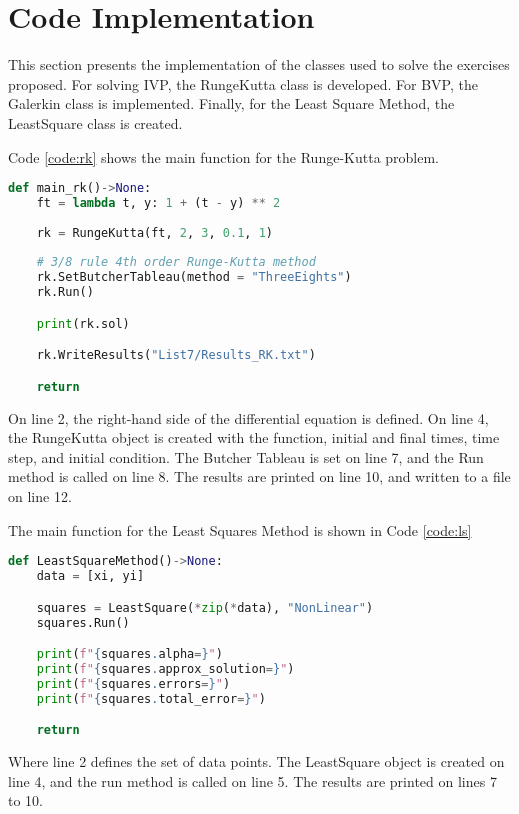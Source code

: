 \section{Code Implementation}\label{sec:code_implementation}
This section presents the implementation of the classes used to solve the exercises proposed. For solving IVP, the RungeKutta class is developed. For BVP, the Galerkin class is implemented. Finally, for the Least Square Method, the LeastSquare class is created.

Code \ref{code:rk} shows the main function for the Runge-Kutta problem. 
\begin{lstlisting}[caption={Main function for the Runge-Kutta problem},label={code:rk},language=python]
def main_rk()->None:
    ft = lambda t, y: 1 + (t - y) ** 2
        
    rk = RungeKutta(ft, 2, 3, 0.1, 1)
    
    # 3/8 rule 4th order Runge-Kutta method
    rk.SetButcherTableau(method = "ThreeEights")
    rk.Run()

    print(rk.sol)

    rk.WriteResults("List7/Results_RK.txt")

    return
\end{lstlisting}

On line 2, the right-hand side of the differential equation is defined. On line 4, the RungeKutta object is created with the function, initial and final times, time step, and initial condition. The Butcher Tableau is set on line 7, and the Run method is called on line 8. The results are printed on line 10, and written to a file on line 12.

The main function for the Least Squares Method is shown in Code \ref{code:ls}
\begin{lstlisting}[caption={Main function for the Least Squares Method},label={code:ls},language=python]
def LeastSquareMethod()->None:
    data = [xi, yi]

    squares = LeastSquare(*zip(*data), "NonLinear")
    squares.Run()

    print(f"{squares.alpha=}")
    print(f"{squares.approx_solution=}")
    print(f"{squares.errors=}")
    print(f"{squares.total_error=}")

    return
\end{lstlisting}

Where line 2 defines the set of data points. The LeastSquare object is created on line 4, and the run method is called on line 5. The results are printed on lines 7 to 10.



